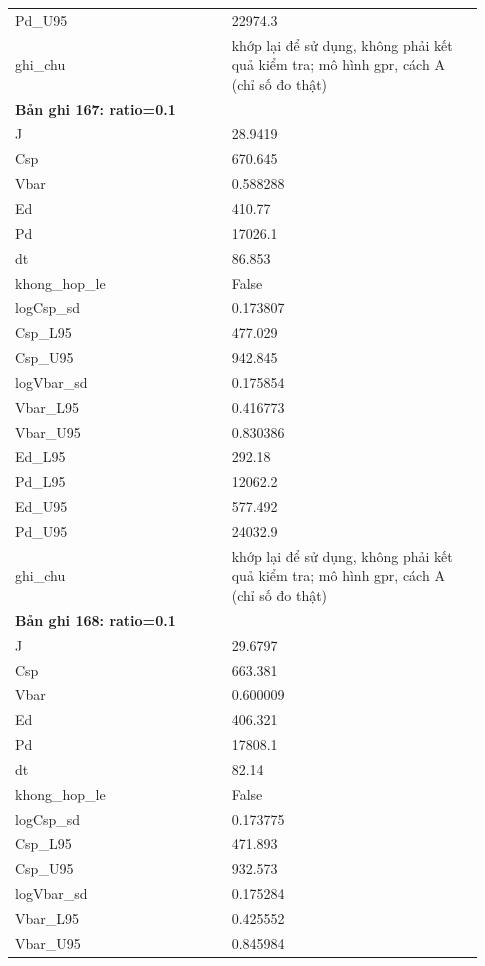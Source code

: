 \begin{longtable}{p{0.43\linewidth}p{0.50\linewidth}}
Pd\_\allowbreak U95 & 22974.3 \\
ghi\_\allowbreak chu & khớp lại để sử dụng, không phải kết quả kiểm tra; mô hình gpr, cách A (chỉ số đo thật) \\
\midrule
\multicolumn{2}{p{0.95\linewidth}}{\textbf{Bản ghi 167: ratio=0.1}} \\
J & 28.9419 \\
Csp & 670.645 \\
Vbar & 0.588288 \\
Ed & 410.77 \\
Pd & 17026.1 \\
dt & 86.853 \\
khong\_\allowbreak hop\_\allowbreak le & False \\
logCsp\_\allowbreak sd & 0.173807 \\
Csp\_\allowbreak L95 & 477.029 \\
Csp\_\allowbreak U95 & 942.845 \\
logVbar\_\allowbreak sd & 0.175854 \\
Vbar\_\allowbreak L95 & 0.416773 \\
Vbar\_\allowbreak U95 & 0.830386 \\
Ed\_\allowbreak L95 & 292.18 \\
Pd\_\allowbreak L95 & 12062.2 \\
Ed\_\allowbreak U95 & 577.492 \\
Pd\_\allowbreak U95 & 24032.9 \\
ghi\_\allowbreak chu & khớp lại để sử dụng, không phải kết quả kiểm tra; mô hình gpr, cách A (chỉ số đo thật) \\
\midrule
\multicolumn{2}{p{0.95\linewidth}}{\textbf{Bản ghi 168: ratio=0.1}} \\
J & 29.6797 \\
Csp & 663.381 \\
Vbar & 0.600009 \\
Ed & 406.321 \\
Pd & 17808.1 \\
dt & 82.14 \\
khong\_\allowbreak hop\_\allowbreak le & False \\
logCsp\_\allowbreak sd & 0.173775 \\
Csp\_\allowbreak L95 & 471.893 \\
Csp\_\allowbreak U95 & 932.573 \\
logVbar\_\allowbreak sd & 0.175284 \\
Vbar\_\allowbreak L95 & 0.425552 \\
Vbar\_\allowbreak U95 & 0.845984 \\

\end{longtable}
